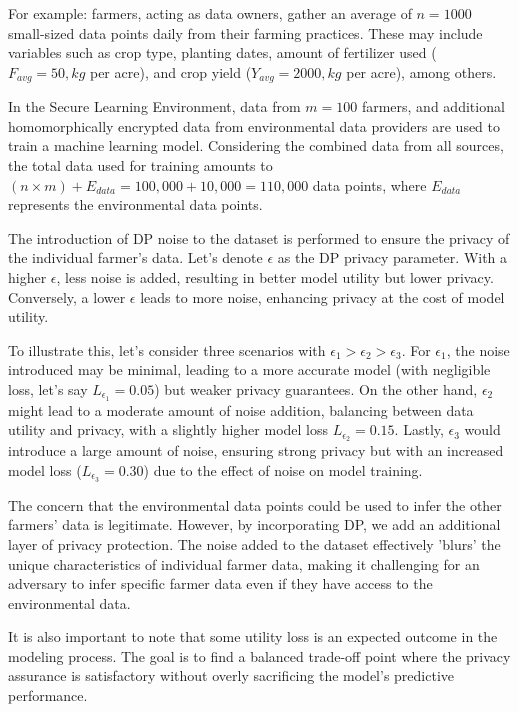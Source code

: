 For example: farmers, acting as data owners, gather an average of $n = 1000$ small-sized data points daily from their farming practices. These may include variables such as crop type, planting dates, amount of fertilizer used ($F_{avg} = 50,kg$ per acre), and crop yield ($Y_{avg} = 2000,kg$ per acre), among others.

In the Secure Learning Environment, data from $m = 100$ farmers, and additional homomorphically encrypted data from environmental data providers are used to train a machine learning model. Considering the combined data from all sources, the total data used for training amounts to $(n \times m) + E_{data} = 100,000 + 10,000 = 110,000$ data points, where $E_{data}$ represents the environmental data points.

The introduction of DP noise to the dataset is performed to ensure the privacy of the individual farmer's data. Let's denote $\epsilon$ as the DP privacy parameter. With a higher $\epsilon$, less noise is added, resulting in better model utility but lower privacy. Conversely, a lower $\epsilon$ leads to more noise, enhancing privacy at the cost of model utility.

To illustrate this, let's consider three scenarios with $\epsilon_1 > \epsilon_2 > \epsilon_3$. For $\epsilon_1$, the noise introduced may be minimal, leading to a more accurate model (with negligible loss, let's say $L_{\epsilon_1} = 0.05$) but weaker privacy guarantees. On the other hand, $\epsilon_2$ might lead to a moderate amount of noise addition, balancing between data utility and privacy, with a slightly higher model loss $L_{\epsilon_2} = 0.15$. Lastly, $\epsilon_3$ would introduce a large amount of noise, ensuring strong privacy but with an increased model loss ($L_{\epsilon_3} = 0.30$) due to the effect of noise on model training.

The concern that the environmental data points could be used to infer the other farmers' data is legitimate. However, by incorporating DP, we add an additional layer of privacy protection. The noise added to the dataset effectively 'blurs' the unique characteristics of individual farmer data, making it challenging for an adversary to infer specific farmer data even if they have access to the environmental data.

It is also important to note that some utility loss is an expected outcome in the modeling process.
The goal is to find a balanced trade-off point where the privacy assurance is satisfactory without overly sacrificing the model's predictive performance.

